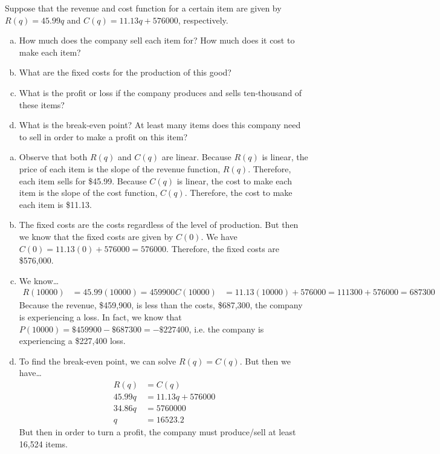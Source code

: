 \documentclass[11pt,letterpaper]{article}
\begin{document}

 Suppose that the revenue and cost function for a certain item are given by $R(q)= 45.99q$ and $C(q)= 11.13q + 576000$, respectively. 
	\begin{enumerate}[(a)]
	\item How much does the company sell each item for? How much does it cost to make each item?
	\item What are the fixed costs for the production of this good?
	\item What is the profit or loss if the company produces and sells ten-thousand of these items?
	\item What is the break-even point? At least many items does this company need to sell in order to make a profit on this item?
	\end{enumerate} \pspace

\sol 
\begin{enumerate}[(a)]
\item Observe that both $R(q)$ and $C(q)$ are linear. Because $R(q)$ is linear, the price of each item is the slope of the revenue function, $R(q)$. Therefore, each item sells for \$45.99. Because $C(q)$ is linear, the cost to make each item is the slope of the cost function, $C(q)$. Therefore, the cost to make each item is \$11.13. \pspace

\item The fixed costs are the costs regardless of the level of production. But then we know that the fixed costs are given by $C(0)$. We have $C(0)= 11.13(0) + 576000= 576000$. Therefore, the fixed costs are \$576,000. \pspace

\item We know\dots
	\[
	\begin{aligned}
	R(10000)&= 45.99(10000)= 459900
	C(10000)&= 11.13(10000) + 576000= 111300 + 576000= 687300
	\end{aligned}
	\]
Because the revenue, \$459,900, is less than the costs, \$687,300, the company is experiencing a loss. In fact, we know that $P(10000)= \$459900 - \$687300= -\$227400$, i.e. the company is experiencing a \$227,400 loss. \pspace

\item To find the break-even point, we can solve $R(q)= C(q)$. But then we have\dots
	\[
	\begin{aligned}
	R(q)&= C(q) \\
	45.99q&= 11.13q + 576000 \\
	34.86q&= 5760000 \\
	q&= 16523.2
	\end{aligned}
	\]
But then in order to turn a profit, the company must produce/sell at least 16,524 items. 
\end{enumerate}
\end{document}
